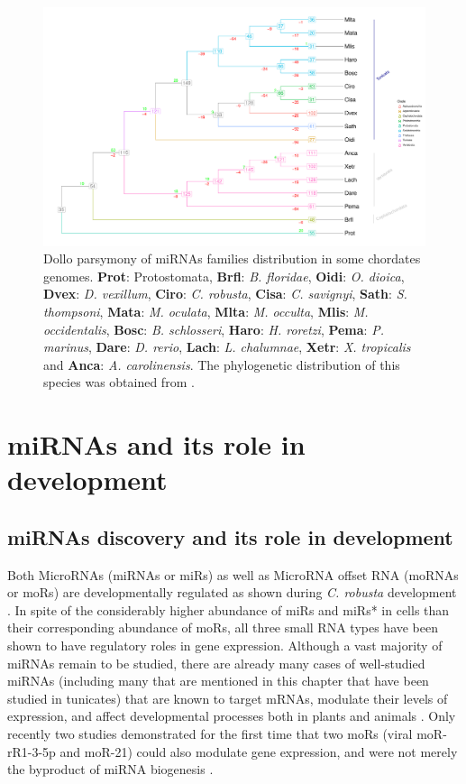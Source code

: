 \documentclass[graybox]{svmult}
\begin{document}
\begin{figure}[t]
\sidecaption[t]
\includegraphics[width=\textwidth]{./Images/last_tree_miRNAs}
\caption{Dollo parsymony of miRNAs families distribution in some 
chordates genomes. \textbf{Prot}: Protostomata, \textbf{Brfl}: \textit{B. floridae},
\textbf{Oidi}: \textit{O. dioica}, \textbf{Dvex}: \textit{D. vexillum},
\textbf{Ciro}: \textit{C. robusta}, \textbf{Cisa}: \textit{C. savignyi}, \textbf{Sath}: \textit{S. thompsoni},
\textbf{Mata}: \textit{M. oculata}, \textbf{Mlta}: \textit{M. occulta},
\textbf{Mlis}: \textit{M. occidentalis}, \textbf{Bosc}: \textit{B. schlosseri},
\textbf{Haro}: \textit{H. roretzi}, \textbf{Pema}: \textit{P. marinus},
\textbf{Dare}: \textit{D. rerio}, \textbf{Lach}: \textit{L. chalumnae},
\textbf{Xetr}: \textit{X. tropicalis} and \textbf{Anca}: \textit{A.
carolinensis}. The phylogenetic distribution of this species was obtained from 
\citep{Delsuc:2017, Kocot:2018}.}
\label{fig:dollotree}
\end{figure}

\section{miRNAs and its role in development}
\label{sec:3}

\subsection{miRNAs discovery and its role in development}

Both MicroRNAs (miRNAs or miRs) as well as MicroRNA offset RNA (moRNAs or moRs) 
are developmentally regulated as shown during \textit{C. robusta} development 
\citep{Shi2009}. In spite of the considerably higher abundance of miRs and 
miRs* in cells than their corresponding abundance of moRs, all three small RNA 
types have been shown to have regulatory roles in gene expression. Although a 
vast majority of miRNAs remain to be studied, there are already many cases of 
well-studied miRNAs (including many that are mentioned in this chapter that 
have been studied in tunicates) that are known to target mRNAs, modulate their 
levels of expression, and affect developmental processes both in plants and 
animals \citep{Zhao2018}. Only recently two studies demonstrated for 
the first time that two moRs (viral moR-rR1-3-5p and moR-21) could also 
modulate gene expression, and were not merely the byproduct of miRNA biogenesis 
\citep{UMBACH2010592, Zhao2016}.
\end{document}
